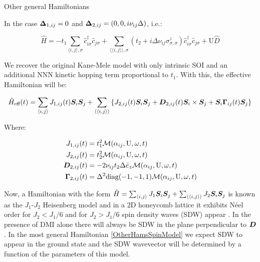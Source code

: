 \begin{section}{Other general Hamiltonians}
\label{SectionOtherHams}


In the case $\boldsymbol{\Delta}_{1,ij} = 0$ and $\boldsymbol{\Delta}_{2,ij} = (0, 0, i \nu_{ij} \Delta)$, i.e.:

\begin{equation}
\hat{H} = - t_1\sum_{\langle i,j \rangle, \sigma} \hat{c}_{i \sigma}^\dagger \hat{c}_{j \sigma} + 
	\sum_{\langle \langle i,j \rangle \rangle, \sigma}(t_2 + i\Delta\nu_{ij}\sigma^z_{\sigma, \sigma})\hat{c}_{i \sigma}^\dagger \hat{c}_{j \sigma} + 
	\text{U}\hat{D}
\end{equation}

We recover the original Kane-Mele model with only intrinsic SOI and an additional NNN kinetic hopping term proportional to $t_1$. With this, the effective Hamiltonian will be:

\begin{equation}
\label{OtherHamsSpinModel}
\hat{H}_{\text{eff}}(t) = \sum_{\langle i,j \rangle} J_{1,ij}(t)\boldsymbol{S}_i\boldsymbol{S}_j + \sum_{\langle \langle i,j \rangle \rangle} \left\{ J_{2,ij}(t)\boldsymbol{S}_i\boldsymbol{S}_j + \boldsymbol{D}_{2,ij}(t) \boldsymbol{S}_i \times \boldsymbol{S}_j + \boldsymbol{S}_i \boldsymbol{\Gamma}_{ij}(t) \boldsymbol{S}_j \right\}
\end{equation}

Where:

\begin{align*}
J_{1,ij}(t) &= t_1^2\mathcal{M}(\alpha_{ij}, \text{U}, \omega, t) \\
J_{2,ij}(t) &= t_2^2\mathcal{M}(\alpha_{ij}, \text{U}, \omega, t) \\
\boldsymbol{D}_{2,ij}(t) &= - 2\nu_{ij} t_2 \Delta \hat{e}_z \mathcal{M}(\alpha_{ij}, \text{U}, \omega, t) \\
\boldsymbol{\Gamma}_{2,ij}(t) &= \Delta^2 \text{diag}(-1,-1,1) \mathcal{M}(\alpha_{ij}, \text{U}, \omega, t) 
\end{align*}

Now, a Hamiltonian with the form $\hat{H} = \sum_{\langle i,j \rangle} J_1 \boldsymbol{S}_i\boldsymbol{S}_j + \sum_{\langle \langle i,j \rangle \rangle} J_2\boldsymbol{S}_i\boldsymbol{S}_j$ is known as the $J_1$-$J_2$ Heisenberg model and in a 2D honeycomb lattice it exhibits N\'eel order for $J_2 < J_1 / 6$ and for $J_2 > J_1 / 6$ spin density waves (SDW) appear \cite{Mulder2010}. In the presence of DMI alone there will always be SDW in the plane perpendicular to $\boldsymbol{D}$ \cite{Uchida2006}. In the most general Hamiltonian \ref{OtherHamsSpinModel} we expect SDW to appear in the ground state and the SDW wavevector will be determined by a function of the parameters of this model. 


\end{section}
